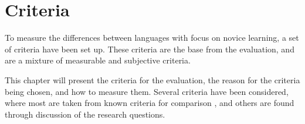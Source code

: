 \chapter{Criteria}
\label{chap:criteria}
To measure the differences between languages with focus on novice learning, a set of criteria have been set up. These criteria are the base from the evaluation, and are a mixture of measurable and subjective criteria.

This chapter will present the criteria for the evaluation, the reason for the criteria being chosen, and how to measure them. Several criteria have been considered, where most are taken from known criteria for comparison \cite{design_criteria1} \cite{design_criteria2}, and others are found through discussion of the research questions.


